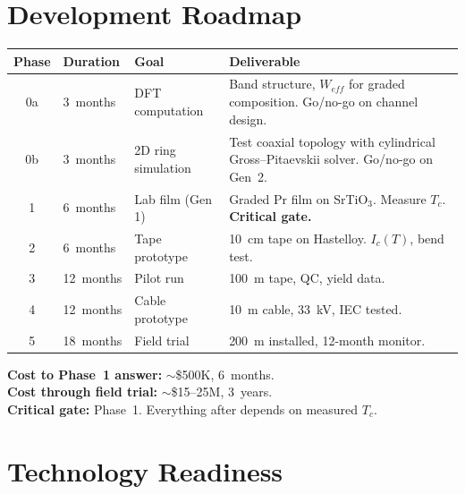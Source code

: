 \documentclass[11pt, a4paper]{article}
\begin{document}
\section{Development Roadmap}
\label{sec:roadmap}

\begin{center}
\begin{tabular}{@{}clp{3cm}p{5cm}@{}}
\toprule
\textbf{Phase} & \textbf{Duration} & \textbf{Goal} &
  \textbf{Deliverable} \\
\midrule
0a & 3~months & DFT computation & Band structure, $W_{eff}$ for
     graded composition. Go/no-go on channel design. \\
0b & 3~months & 2D ring simulation & Test coaxial topology with
     cylindrical Gross--Pitaevskii solver. Go/no-go on Gen~2. \\
1 & 6~months & Lab film (Gen 1) & Graded Pr film on SrTiO$_3$.
    Measure $T_c$. \textbf{Critical gate.} \\
2 & 6~months & Tape prototype & 10~cm tape on Hastelloy.
    $I_c(T)$, bend test. \\
3 & 12~months & Pilot run & 100~m tape, QC, yield data. \\
4 & 12~months & Cable prototype & 10~m cable, 33~kV, IEC tested. \\
5 & 18~months & Field trial & 200~m installed, 12-month monitor. \\
\bottomrule
\end{tabular}
\end{center}

\textbf{Cost to Phase~1 answer:} $\sim$\$500K, 6~months. \\
\textbf{Cost through field trial:} $\sim$\$15--25M, 3~years. \\
\textbf{Critical gate:} Phase~1. Everything after depends on measured $T_c$.

\section{Technology Readiness}
\end{document}
